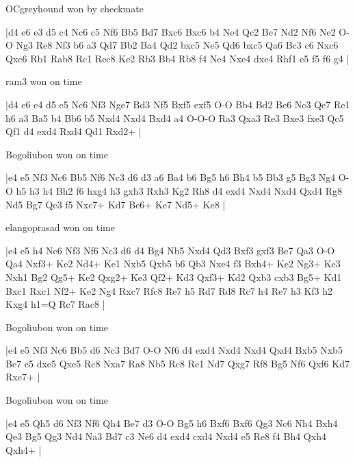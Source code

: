 \showboard

OCgreyhound won by checkmate

\makegametitle
|d4 e6 e3 d5 c4 Nc6 c5 Nf6 Bb5 Bd7 Bxc6 Bxc6 b4 Ne4 Qc2 Be7 Nd2 Nf6 Ne2 O-O Ng3 Re8 Nf3 b6 a3 Qd7 Bb2 Ba4 Qd2 bxc5 Ne5 Qd6 bxc5 Qa6 Bc3 c6 Nxc6 Qxc6 Rb1 Rab8 Rc1 Rec8 Ke2 Rb3 Bb4 Rb8 f4 Ne4 Nxe4 dxe4 Rhf1 e5 f5 f6 g4  |

\showboard

ram3 won on time

\makegametitle
|d4 e6 e4 d5 e5 Nc6 Nf3 Nge7 Bd3 Nf5 Bxf5 exf5 O-O Bb4 Bd2 Be6 Nc3 Qe7 Re1 h6 a3 Ba5 b4 Bb6 b5 Nxd4 Nxd4 Bxd4 a4 O-O-O Ra3 Qxa3 Re3 Bxe3 fxe3 Qc5 Qf1 d4 exd4 Rxd4 Qd1 Rxd2+  |

\showboard

Bogoliubon won on time

\makegametitle
|e4 e5 Nf3 Nc6 Bb5 Nf6 Nc3 d6 d3 a6 Ba4 b6 Bg5 h6 Bh4 b5 Bb3 g5 Bg3 Ng4 O-O h5 h3 h4 Bh2 f6 hxg4 h3 gxh3 Rxh3 Kg2 Rh8 d4 exd4 Nxd4 Nxd4 Qxd4 Rg8 Nd5 Bg7 Qc3 f5 Nxc7+ Kd7 Be6+ Ke7 Nd5+ Ke8  |

\showboard

elangoprasad won on time

\makegametitle
|e4 e5 h4 Nc6 Nf3 Nf6 Nc3 d6 d4 Bg4 Nb5 Nxd4 Qd3 Bxf3 gxf3 Be7 Qa3 O-O Qa4 Nxf3+ Ke2 Nd4+ Ke1 Nxb5 Qxb5 b6 Qb3 Nxe4 f3 Bxh4+ Ke2 Ng3+ Ke3 Nxh1 Bg2 Qg5+ Ke2 Qxg2+ Ke3 Qf2+ Kd3 Qxf3+ Kd2 Qxb3 cxb3 Bg5+ Kd1 Bxc1 Rxc1 Nf2+ Ke2 Ng4 Rxc7 Rfc8 Re7 h5 Rd7 Rd8 Rc7 h4 Re7 h3 Kf3 h2 Kxg4 h1=Q Rc7 Rac8  |

\showboard

Bogoliubon won on time

\makegametitle
|e4 e5 Nf3 Nc6 Bb5 d6 Nc3 Bd7 O-O Nf6 d4 exd4 Nxd4 Nxd4 Qxd4 Bxb5 Nxb5 Be7 e5 dxe5 Qxe5 Rc8 Nxa7 Ra8 Nb5 Rc8 Re1 Nd7 Qxg7 Rf8 Bg5 Nf6 Qxf6 Kd7 Rxe7+  |

\showboard

Bogoliubon won on time

\makegametitle
|e4 e5 Qh5 d6 Nf3 Nf6 Qh4 Be7 d3 O-O Bg5 h6 Bxf6 Bxf6 Qg3 Nc6 Nh4 Bxh4 Qe3 Bg5 Qg3 Nd4 Na3 Bd7 c3 Ne6 d4 exd4 cxd4 Nxd4 e5 Re8 f4 Bh4 Qxh4 Qxh4+  |

